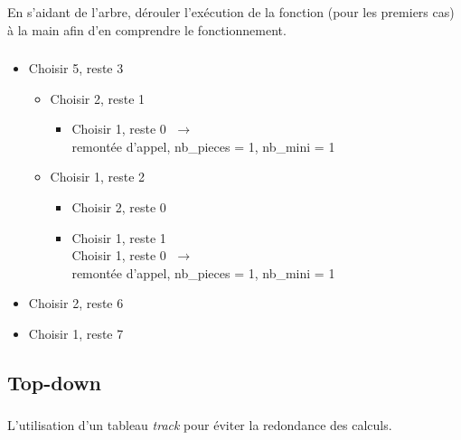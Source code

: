 \documentclass[svgnames,11pt]{beamer}
\begin{document}
\begin{frame}
    \frametitle{}

    \begin{activite}
        En s'aidant de l'arbre, dérouler l'exécution de la fonction (pour les premiers cas) à la main afin d'en comprendre le fonctionnement.
        \end{activite}

\end{frame}
\begin{frame}
    \frametitle{}

    \begin{itemize}
        \item Choisir 5, reste 3
        \begin{itemize}
            \item Choisir 2, reste 1
            \begin{itemize}
                \item Choisir 1, reste 0 $\;\rightarrow\;$ \\remontée d'appel, nb\_pieces = 1, nb\_mini = 1
            \end{itemize}
            \item Choisir 1, reste 2
            \begin{itemize}
                \item Choisir 2, reste 0
                \item Choisir 1, reste 1\\
                Choisir 1, reste 0 $\;\rightarrow\;$ \\remontée d'appel, nb\_pieces = 1, nb\_mini = 1
                
            \end{itemize}
        \end{itemize}
        \item Choisir 2, reste 6
        \item Choisir 1, reste 7
    \end{itemize}

\end{frame}
\subsection{Top-down}
\begin{frame}
    \frametitle{}

    L'utilisation d'un tableau \emph{track} pour éviter la redondance des calculs.

\end{frame}
\end{document}
